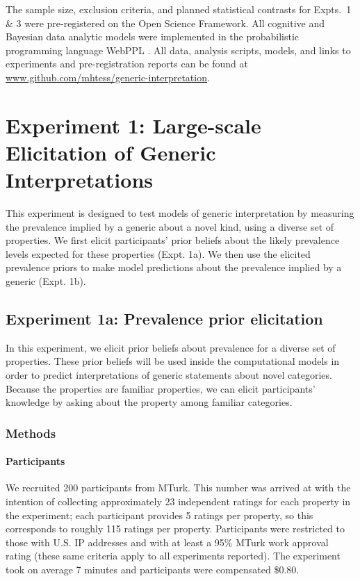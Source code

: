 \documentclass[floatsintext,doc]{apa6}
\let\oldparagraph\paragraph
\renewcommand{\paragraph}[1]{\oldparagraph{#1}\mbox{}}
\begin{document}
The sample size, exclusion criteria, and planned statistical contrasts for Expts.~1 \& 3 were pre-registered on the Open Science Framework.
All cognitive and Bayesian data analytic models were implemented in the probabilistic programming language WebPPL \cite{dippl}. 
All data, analysis scripts, models, and links to experiments and pre-registration reports can be found at \url{www.github.com/mhtess/generic-interpretation}.

\hypertarget{experiment-1}{%
\section{Experiment 1: Large-scale Elicitation of Generic Interpretations}\label{experiment-1}}

This experiment is designed to test models of generic interpretation by measuring the prevalence implied by a generic about a novel kind, using a diverse set of properties.
We first elicit participants' prior beliefs about the likely prevalence levels expected for these properties (Expt. 1a).
We then use the elicited prevalence priors to make model predictions about the prevalence implied by a generic (Expt. 1b).

\hypertarget{experiment-1a-prevalence-prior-elicitation}{%
\subsection{Experiment 1a: Prevalence prior elicitation}\label{experiment-1a-prevalence-prior-elicitation}}

In this experiment, we elicit prior beliefs about prevalence for a diverse set of properties.
These prior beliefs will be used inside the computational models in order to predict interpretations of generic statements about novel categories. %
Because the properties are familiar properties, we can elicit participants' knowledge by asking about the property among familiar  categories.

\hypertarget{methods}{%
\subsubsection{Methods}\label{methods}}

\hypertarget{participants-1}{%
\paragraph{Participants}\label{participants-1}}
We recruited 200 participants from MTurk.
This number was arrived at with the intention of collecting approximately 23 independent ratings for each property in the experiment; each participant provides 5 ratings per property, so this corresponds to roughly 115 ratings per property. 
Participants were restricted to those with U.S. IP addresses and with at least a 95\% MTurk work approval rating (these same criteria apply to all experiments reported).
The experiment took on average 7 minutes and participants were compensated \$0.80.
\end{document}
